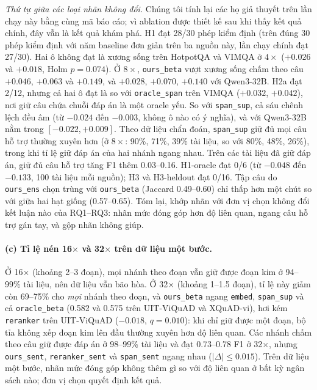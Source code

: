\documentclass[11pt]{article}
\newcommand{\arm}[1]{\texttt{#1}}
\begin{document}
\emph{Thứ tự giữa các loại nhãn không đổi.} Chúng tôi tính lại các họ giả thuyết trên lần chạy này bằng cùng mã
báo cáo; vì ablation được thiết kế sau khi thấy kết quả chính, đây vẫn là kết quả khám phá. H1 đạt 28/30 phép kiểm
định (trên đúng 30 phép kiểm định với năm baseline đơn giản trên ba nguồn này, lần chạy chính đạt 27/30). Hai ô không
đạt là xương sống trên HotpotQA và VIMQA ở $4\times$ ($+0.026$ và $+0.018$, Holm $p=0.074$). Ở $8\times$,
\arm{ours\_beta} vượt xương sống chấm theo câu $+0.046$, $+0.063$ và $+0.149$, và $+0.028$, $+0.070$, $+0.140$ với
Qwen3-32B. H2a đạt 2/12, nhưng cả hai ô đạt là so với \arm{oracle\_span} trên VIMQA ($+0.032$, $+0.042$), nơi giữ câu
chứa chuỗi đáp án là một oracle yếu. So với \arm{span\_sup}, cả sáu chênh lệch đều âm (từ $-0.024$ đến $-0.003$, không
ô nào có ý nghĩa), và với Qwen3-32B nằm trong $[-0.022, +0.009]$. Theo dữ liệu chẩn đoán, \arm{span\_sup} giữ đủ mọi
câu hỗ trợ thường xuyên hơn (ở $8\times$: 90\%, 71\%, 39\% tài liệu, so với 80\%, 48\%, 26\%), trong khi tỉ lệ giữ
đáp án của hai nhánh ngang nhau. Trên các tài liệu đã giữ đáp án, giữ đủ câu hỗ trợ tăng F1 thêm 0.03--0.16. H1-oracle
đạt 0/6 (từ $-0.048$ đến $-0.133$, 100 tài liệu mỗi nguồn); H3 và H3-heldout đạt 0/16. Tập câu do \arm{ours\_ens} chọn
trùng với \arm{ours\_beta} (Jaccard 0.49--0.60) chỉ thấp hơn một chút so với giữa hai hạt giống (0.57--0.65).
Tóm lại, khớp nhãn với đơn vị chọn không đổi kết luận nào của RQ1--RQ3: nhãn mức đóng góp hơn độ liên quan, ngang câu
hỗ trợ gán tay, và gộp nhãn không giúp.

\paragraph{(c) Tỉ lệ nén 16$\times$ và 32$\times$ trên dữ liệu một bước.} Ở 16$\times$ (khoảng 2--3 đoạn), mọi nhánh
theo đoạn vẫn giữ được đoạn kim ở 94--99\% tài liệu, nên dữ liệu vẫn bão hòa. Ở 32$\times$ (khoảng 1--1.5 đoạn), tỉ lệ
này giảm còn 69--75\% cho \emph{mọi} nhánh theo đoạn, và \arm{ours\_beta} ngang \arm{embed}, \arm{span\_sup} và cả
\arm{oracle\_beta} (0.582 và 0.575 trên UIT-ViQuAD và XQuAD-vi), hơi kém \arm{reranker} trên UIT-ViQuAD ($-0.018$,
$q=0.010$): khi chỉ giữ được một đoạn, bộ tỉa không xếp đoạn kim lên đầu thường xuyên hơn độ liên quan. Các nhánh chấm
theo câu giữ được đáp án ở 98--99\% tài liệu và đạt 0.73--0.78 F1 ở 32$\times$, nhưng \arm{ours\_sent},
\arm{reranker\_sent} và \arm{span\_sent} ngang nhau ($|\Delta|\le0.015$). Trên dữ liệu một bước, nhãn mức đóng góp
không thêm gì so với độ liên quan ở bất kỳ ngân sách nào; đơn vị chọn quyết định kết quả.
\end{document}
